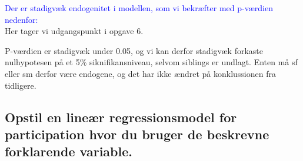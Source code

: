 \documentclass[
  10pt,
]{article}
\newenvironment{Shaded}{\begin{snugshade}}{\end{snugshade}}
\newcommand{\CommentTok}[1]{\textcolor[rgb]{0.56,0.35,0.01}{\textit{#1}}}
\newcommand{\DecValTok}[1]{\textcolor[rgb]{0.00,0.00,0.81}{#1}}
\newcommand{\KeywordTok}[1]{\textcolor[rgb]{0.13,0.29,0.53}{\textbf{#1}}}
\newcommand{\NormalTok}[1]{#1}
\newcommand{\OperatorTok}[1]{\textcolor[rgb]{0.81,0.36,0.00}{\textbf{#1}}}
\newcommand{\StringTok}[1]{\textcolor[rgb]{0.31,0.60,0.02}{#1}}
\begin{document}
\textcolor{blue}{Der er stadigvæk endogenitet i modellen, som vi bekræfter med p-værdien nedenfor:}\\
Her tager vi udgangspunkt i opgave 6.

\begin{Shaded}
\end{Shaded}

P-værdien er stadigvæk under 0.05, og vi kan derfor stadigvæk forkaste
nulhypotesen på et 5\% siknifikansniveau, selvom siblings er undlagt.
Enten må sf eller sm derfor være endogene, og det har ikke ændret på
konklussionen fra tidligere.



\hypertarget{opstil-en-lineuxe6r-regressionsmodel-for-participation-hvor-du-bruger-de-beskrevne-forklarende-variable.}{%
\subsection{Opstil en lineær regressionsmodel for participation hvor du
bruger de beskrevne forklarende
variable.}\label{opstil-en-lineuxe6r-regressionsmodel-for-participation-hvor-du-bruger-de-beskrevne-forklarende-variable.}}
\end{document}

